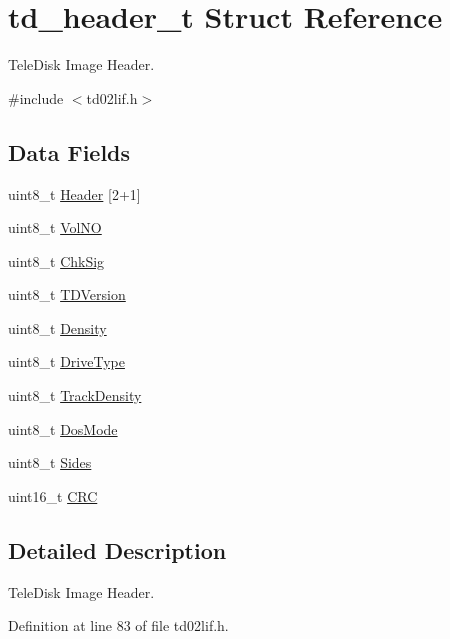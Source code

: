\hypertarget{structtd__header__t}{}\section{td\+\_\+header\+\_\+t Struct Reference}
\label{structtd__header__t}


Tele\+Disk Image Header.  




{\ttfamily \#include $<$td02lif.\+h$>$}

\subsection*{Data Fields}
\begin{DoxyCompactItemize}
\item 
uint8\+\_\+t \hyperlink{structtd__header__t_a41510629d6bb7852f4e1e43443c38edd}{Header} \mbox{[}2+1\mbox{]}
\item 
uint8\+\_\+t \hyperlink{structtd__header__t_a081c4518281071d65fe82f6c8260b1f5}{Vol\+NO}
\item 
uint8\+\_\+t \hyperlink{structtd__header__t_ad226c52f8f8481b0ebf826dd3128ba3d}{Chk\+Sig}
\item 
uint8\+\_\+t \hyperlink{structtd__header__t_ac63e3625279d7262e3d094c0c5e5753a}{T\+D\+Version}
\item 
uint8\+\_\+t \hyperlink{structtd__header__t_a09c0c52ec99733db61dd6f3c7d052325}{Density}
\item 
uint8\+\_\+t \hyperlink{structtd__header__t_a865bd11809e67fd4ca8f1af0c46d9600}{Drive\+Type}
\item 
uint8\+\_\+t \hyperlink{structtd__header__t_a2d1461bb956665d519d33fca629477ab}{Track\+Density}
\item 
uint8\+\_\+t \hyperlink{structtd__header__t_acb0710bd6f98290ea2490ce678b63894}{Dos\+Mode}
\item 
uint8\+\_\+t \hyperlink{structtd__header__t_a8b188d880b5d9d94122674265b0ca3e6}{Sides}
\item 
uint16\+\_\+t \hyperlink{structtd__header__t_ae51197a200b65947359773f1aeea9c2d}{C\+RC}
\end{DoxyCompactItemize}


\subsection{Detailed Description}
Tele\+Disk Image Header. 

Definition at line 83 of file td02lif.\+h.



